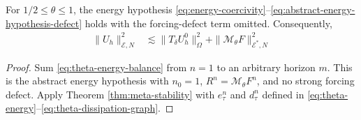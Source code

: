 \documentclass[11pt]{article}
\begin{document}
\begin{cor}
\label{cor:theta-stability}
For \(1/2\le\theta\le1\), the energy hypothesis
\eqref{eq:energy-coercivity}--\eqref{eq:abstract-energy-hypothesis-defect}
holds with the forcing-defect term omitted.
Consequently,
\begin{align}
\|U_h\|_{\mathcal E,N}^2
&\lesssim\|T_{\delta}U_h^0\|_{\Omega}^2
+\|\mathcal M_{\theta}F\|_{\mathcal E^*,N}^2 \label{eq:theta-stability-estimate}
\end{align}
\end{cor}
\begin{proof}
Sum \eqref{eq:theta-energy-balance} from \(n=1\) to an arbitrary horizon
\(m\). This is the abstract energy hypothesis with \(n_0=1\),
\(R^n=\mathcal M_{\theta}F^n\), and no strong forcing defect. Apply Theorem
\ref{thm:meta-stability} with
\(e_{\tau}^n\) and \(d_{\tau}^n\) defined in
\eqref{eq:theta-energy}--\eqref{eq:theta-dissipation-graph}.
\end{proof}

\end{document}
